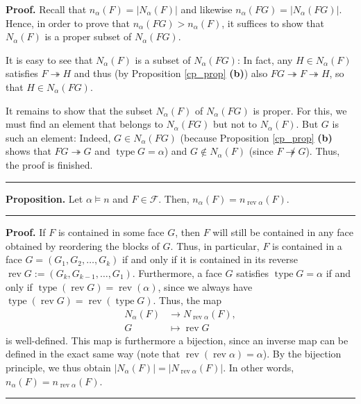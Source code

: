 \documentclass[12pt]{article}
\theoremstyle{definition}%
\newtheorem{prop}[thm]{Proposition}
\theoremstyle{definition}%
\theoremstyle{remark}%
\newcommand{\tup}[1]{\left( #1 \right)}
\newcommand{\card}[1]{\left| #1 \right|} %
\newcommand{\CF}{\mathcal{F}}
\newcommand{\na}{n_{ \alpha } }%
\newcommand{\Na}{N_{ \alpha } }%
\newcommand{\rev}{\operatorname{rev}}
\newcommand{\type}{\operatorname{type}}
\newcommand{\con}{\twoheadrightarrow} %
\newenvironment{prop}[1][Proposition]{\noindent\textbf{#1.} }{\ \rule{0.5em}{0.5em}}
\newenvironment{proof}[1][Proof]{\noindent\textbf{#1.} }{\ \rule{0.5em}{0.5em}}
\begin{document}
\begin{proof}
   Recall that $\na\tup{F} = \card{\Na\tup{F}}$ and
   likewise $\na\tup{FG} = \card{\Na\tup{FG}}$.
   Hence, in order to prove that $\na\tup{FG} > \na\tup{F}$, %
   it suffices to show that $\Na\tup{F}$ is a proper subset of $\Na\tup{FG}$.
   
   It is easy to see that $\Na\tup{F}$ is a subset of $\Na\tup{FG}$: In fact, any $H \in \Na\tup{F}$ satisfies $F \con H$ and thus (by Proposition \ref{cp_prop} \textbf{(b)}) also $FG \con F \con H$, so that $H \in \Na\tup{FG}$.
   
   It remains to show that the subset $\Na\tup{F}$ of $\Na\tup{FG}$ is proper.
   For this, we must find an element that belongs to $\Na\tup{FG}$ but not to $\Na\tup{F}$.
   But $G$ is such an element: Indeed, $G \in \Na\tup{FG}$ (because Proposition \ref{cp_prop} \textbf{(b)} shows that $FG \con G$ and $\type G = \alpha$) and $G \notin \Na\tup{F}$ (since $F \not\con G$).
   Thus, the proof is finished.
\end{proof}

\begin{prop}
    \label{na.prop.2}
    Let $\alpha \models n$ and $F \in \CF$.
	Then, $\na\tup{F} = n_{\rev \alpha}\tup{F}$.
\end{prop}

\begin{proof}
    If $F$ is contained in some face $G$, then $F$ will still be contained in any face obtained by reordering the blocks of $G$.
	Thus, in particular, $F$ is contained in a face $G = \tup{G_{1},G_{2},\dots,G_{k}}$ if and only if it is contained in its reverse $\rev G := \tup{G_{k},G_{k-1},\dots,G_{1}}$.
	Furthermore, a face $G$ satisfies $\type G = \alpha$ if and only if $\type\tup{\rev G} = \rev(\alpha)$, since we always have $\type\tup{\rev G} = \rev(\type G)$.
	Thus, the map
	\begin{align*}
	\Na\tup{F} &\to N_{\rev \alpha}\tup{F}, \\
	G &\mapsto \rev G
	\end{align*}
	is well-defined.
	This map is furthermore a bijection, since an inverse map can be defined in the exact same way (note that $\rev\tup{\rev \alpha} = \alpha$).
	By the bijection principle, we thus obtain
	$\card{\Na\tup{F}} = \card{N_{\rev \alpha}\tup{F}}$.
	In other words, $\na\tup{F} = n_{\rev \alpha}\tup{F}$.
\end{proof}
\end{document}
